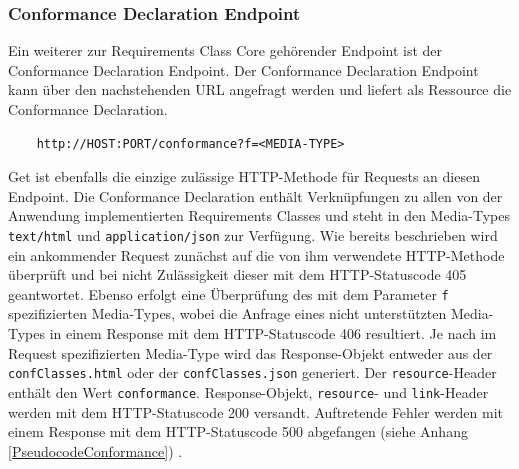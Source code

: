 \subsubsection{Conformance Declaration Endpoint}
Ein weiterer zur Requirements Class Core gehörender Endpoint ist der Conformance Declaration Endpoint.
Der Conformance Declaration Endpoint kann über den nachstehenden URL angefragt werden und liefert als 
Ressource die Conformance Declaration. 
\begin{center}
\begin{BVerbatim}
    http://HOST:PORT/conformance?f=<MEDIA-TYPE>
\end{BVerbatim}
\end{center}
Get ist ebenfalls die einzige zulässige HTTP-Methode für Requests an diesen Endpoint.
Die Conformance Declaration enthält Verknüpfungen zu allen von der Anwendung implementierten Requirements Classes und steht in den Media-Types \verb|text/html| 
und \verb|application/json| zur Verfügung.
Wie bereits beschrieben wird ein ankommender Request zunächst auf die von ihm verwendete HTTP-Methode überprüft und bei nicht Zulässigkeit dieser mit dem 
HTTP-Statuscode 405 geantwortet. Ebenso erfolgt eine Überprüfung des mit dem Parameter \verb|f|
spezifizierten Media-Types, wobei die Anfrage eines nicht unterstützten Media-Types in einem 
Response mit dem HTTP-Statuscode 406 resultiert. Je nach im Request spezifizierten Media-Type wird das Response-Objekt entweder aus der \verb|confClasses.html| oder 
der \verb|confClasses.json| generiert. Der \verb|resource|-Header
enthält den Wert \verb|conformance|. Response-Objekt, \verb|resource|- und \verb|link|-Header werden mit dem 
HTTP-Statuscode 200 versandt. Auftretende Fehler werden mit einem Response mit dem HTTP-Statuscode 500 abgefangen
(siehe Anhang \ref{PseudocodeConformance}) \cite{code,ogc_api_processes_core}.

